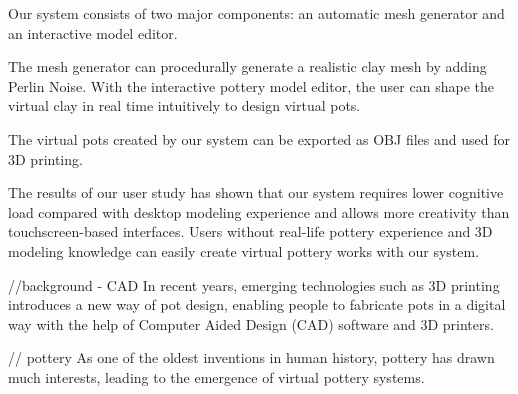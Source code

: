 Our system consists of two major components: an automatic mesh generator and an interactive model editor.

The mesh generator can procedurally generate a realistic clay mesh by adding Perlin Noise. With the interactive pottery model editor, the user can shape the virtual clay in real time intuitively to design virtual pots.

The virtual pots created by our system can be exported as OBJ files and used for 3D printing.

The results of our user study has shown that our system requires lower cognitive load compared with desktop modeling experience and allows more creativity than touchscreen-based interfaces. Users without real-life pottery experience and 3D modeling knowledge can easily create virtual pottery works with our system.

//background - CAD
In recent years, emerging technologies such as 3D printing introduces a new way of pot design, enabling people to fabricate pots in a digital way with the help of Computer Aided Design (CAD) software and 3D printers.

// pottery 
As one of the oldest inventions in human history, pottery has drawn much interests, leading to the emergence of virtual pottery systems.


